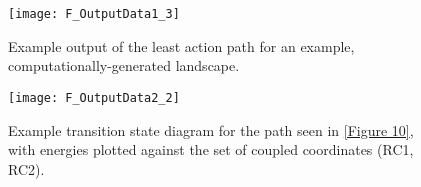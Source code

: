 \documentclass[twocolumn]{biophys-new}
\begin{document}
\setcounter{figure}{9} 
\begin{figure}[hbt!]
\centering
\texttt{[image: F\_OutputData1\_3]}
\caption{Example output of the least action path for an example, computationally-generated landscape.}
\label{Figure 10}
\end{figure}

\setcounter{figure}{10} 
\begin{figure}[hbt!]
\centering
\texttt{[image: F\_OutputData2\_2]}
\caption{Example transition state diagram for the path seen in \autoref{Figure 10}, with energies plotted against the set of coupled coordinates (RC1, RC2).}
\label{Figure 11}
\end{figure}

\end{document}
